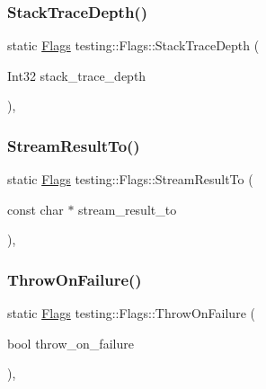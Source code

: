 \mbox{\label{structtesting_1_1Flags_a16b01d8bcceaa9fa8211fd24faa75b5a}} 
\subsubsection{\texorpdfstring{StackTraceDepth()}{StackTraceDepth()}}
{\footnotesize\ttfamily static \mbox{\hyperlink{structtesting_1_1Flags}{Flags}} testing\+::\+Flags\+::\+Stack\+Trace\+Depth (\begin{DoxyParamCaption}\item[{Int32}]{stack\+\_\+trace\+\_\+depth }\end{DoxyParamCaption})\hspace{0.3cm}{\ttfamily [inline]}, {\ttfamily [static]}}

\mbox{\label{structtesting_1_1Flags_a9cf0f64310b28eadbbfbb35584ebfc71}} 
\subsubsection{\texorpdfstring{StreamResultTo()}{StreamResultTo()}}
{\footnotesize\ttfamily static \mbox{\hyperlink{structtesting_1_1Flags}{Flags}} testing\+::\+Flags\+::\+Stream\+Result\+To (\begin{DoxyParamCaption}\item[{const char $\ast$}]{stream\+\_\+result\+\_\+to }\end{DoxyParamCaption})\hspace{0.3cm}{\ttfamily [inline]}, {\ttfamily [static]}}

\mbox{\label{structtesting_1_1Flags_ad856df862414ed0dadf80b5e03829cc7}} 
\subsubsection{\texorpdfstring{ThrowOnFailure()}{ThrowOnFailure()}}
{\footnotesize\ttfamily static \mbox{\hyperlink{structtesting_1_1Flags}{Flags}} testing\+::\+Flags\+::\+Throw\+On\+Failure (\begin{DoxyParamCaption}\item[{bool}]{throw\+\_\+on\+\_\+failure }\end{DoxyParamCaption})\hspace{0.3cm}{\ttfamily [inline]}, {\ttfamily [static]}}



